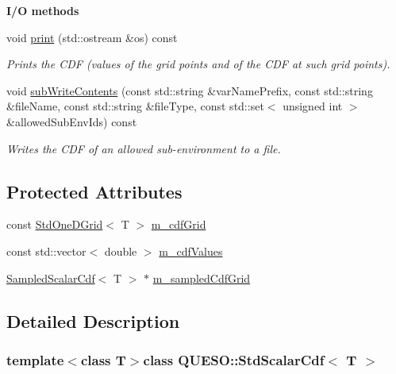 \begin{Indent}{\bf I/\-O methods}\par
\begin{DoxyCompactItemize}
\item 
void \hyperlink{class_q_u_e_s_o_1_1_std_scalar_cdf_af31f2d7dfa14a23987d1d71b36d2d221}{print} (std\-::ostream \&os) const 
\begin{DoxyCompactList}\small\item\em Prints the C\-D\-F (values of the grid points and of the C\-D\-F at such grid points). \end{DoxyCompactList}\item 
void \hyperlink{class_q_u_e_s_o_1_1_std_scalar_cdf_a9c4edf99c3d0bbd5a011b5e03c5a1bcc}{sub\-Write\-Contents} (const std\-::string \&var\-Name\-Prefix, const std\-::string \&file\-Name, const std\-::string \&file\-Type, const std\-::set$<$ unsigned int $>$ \&allowed\-Sub\-Env\-Ids) const 
\begin{DoxyCompactList}\small\item\em Writes the C\-D\-F of an allowed sub-\/environment to a file. \end{DoxyCompactList}\end{DoxyCompactItemize}
\end{Indent}
\subsection*{Protected Attributes}
\begin{DoxyCompactItemize}
\item 
const \hyperlink{class_q_u_e_s_o_1_1_std_one_d_grid}{Std\-One\-D\-Grid}$<$ T $>$ \hyperlink{class_q_u_e_s_o_1_1_std_scalar_cdf_a6d92d555e9042f0c203b59f3b272f878}{m\-\_\-cdf\-Grid}
\item 
const std\-::vector$<$ double $>$ \hyperlink{class_q_u_e_s_o_1_1_std_scalar_cdf_ac04a45e22e2500a5ef8911e2c034364f}{m\-\_\-cdf\-Values}
\item 
\hyperlink{class_q_u_e_s_o_1_1_sampled_scalar_cdf}{Sampled\-Scalar\-Cdf}$<$ T $>$ $\ast$ \hyperlink{class_q_u_e_s_o_1_1_std_scalar_cdf_a2da9aa62766843734025cc059f817258}{m\-\_\-sampled\-Cdf\-Grid}
\end{DoxyCompactItemize}


\subsection{Detailed Description}
\subsubsection*{template$<$class T$>$class Q\-U\-E\-S\-O\-::\-Std\-Scalar\-Cdf$<$ T $>$}

